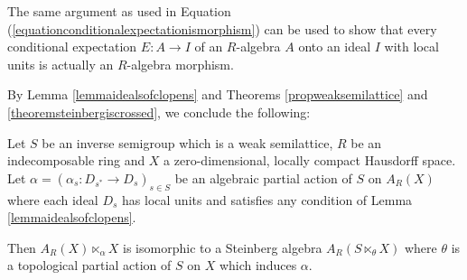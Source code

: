 \begin{remark}
The same argument as used in Equation (\ref{equationconditionalexpectationismorphism}) can be used to show that every conditional expectation $E:A\to I$ of an $R$-algebra $A$ onto an ideal $I$ with local units is actually an $R$-algebra morphism.
\end{remark}

By Lemma \ref{lemmaidealsofclopens} and Theorems \ref{propweaksemilattice} and \ref{theoremsteinbergiscrossed}, we conclude the following:

\begin{theorem}\label{theoremcrossedproductasasteinbergalgebra}
Let $S$ be an inverse semigroup which is a weak semilattice, $R$ be an indecomposable ring and $X$ a zero-dimensional, locally compact Hausdorff space. Let $\alpha=\left(\alpha_s:D_{s^*}\to D_s\right)_{s\in S}$ be an algebraic partial action of $S$ on $A_R(X)$ where each ideal $D_s$ has local units and satisfies any condition of Lemma \ref{lemmaidealsofclopens}.

Then  $A_R(X)\ltimes_{\alpha} X$ is isomorphic to a Steinberg algebra $A_R(S\ltimes_{\theta} X)$ where $\theta$ is a topological partial action of $S$ on $X$ which induces $\alpha$.
\end{theorem}